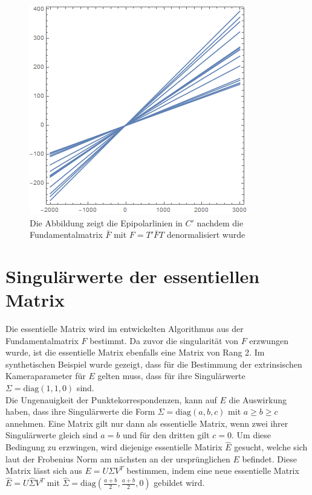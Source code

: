 \begin{figure}[!htb]
	\includegraphics[width=\linewidth]{images/LPrime_PC2_F_Constraint_denormalized.png}
	\caption[Epipolarlinien in $C$ aus singulärer denormalisierter Fundamentalmatrix]{Die Abbildung zeigt die Epipolarlinien in $C'$ nachdem die Fundamentalmatrix $\bar{F}$ mit $F = T'\bar{F}T$ denormalisiert wurde}
	\label{fig:EpipoleWithF2Denorm}
	\endminipage\hfill
\end{figure}

\pagebreak

\section{Singulärwerte der essentiellen Matrix}

Die essentielle Matrix wird im entwickelten Algorithmus aus der Fundamentalmatrix $F$ bestimmt. Da zuvor die singularität von $F$ erzwungen wurde, ist die essentielle Matrix ebenfalls eine Matrix von Rang 2\cite{HZ}. Im synthetischen Beispiel wurde gezeigt, dass für die Bestimmung der extrinsischen Kameraparameter für $E$ gelten muss, dass für ihre Singulärwerte $\Sigma = \text{diag}(1,1,0)$ sind. \\

Die Ungenauigkeit der Punktekorrespondenzen, kann auf $E$ die Auswirkung haben, dass ihre Singulärwerte die Form $\Sigma = \text{diag}(a,b,c)$ mit $a \geq b \geq c$ annehmen. Eine Matrix gilt nur dann als essentielle Matrix, wenn zwei ihrer Singulärwerte gleich sind $a = b$ und für den dritten gilt $c=0$. Um diese Bedingung zu erzwingen, wird diejenige essentielle Matirix $\hat{E}$ gesucht, welche sich laut der Frobenius Norm am nächsten an der ursprünglichen $E$ befindet\cite{HZ,Ferid}. Diese Matrix lässt sich aus $E = U \Sigma V^T$ bestimmen, indem eine neue essentielle Matrix $\hat{E} = U \hat{\Sigma}V^T$ mit $\hat{\Sigma} = \text{diag}(\frac{a+b}{2},\frac{a+b}{2},0)$\cite{HZ} gebildet wird.\\

